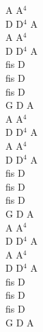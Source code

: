 \documentclass[a5paper, 10pt]{book}
\begin{document}
\begin{minipage}[t]{0.3\textwidth}
A A$^4$\\
D D$^4$ A\\
A A$^4$\\
D D$^4$ A\\
fis D\\
fis D\\
fis D\\
G D A\\

A A$^4$\\
D D$^4$ A\\
A A$^4$\\
D D$^4$ A\\
fis D\\
fis D\\
fis D\\
G D A\\

A A$^4$\\
D D$^4$ A\\
A A$^4$\\
D D$^4$ A\\
fis D\\
fis D\\
fis D\\
G D A\\
\end{minipage}

\newpage
\end{document}

